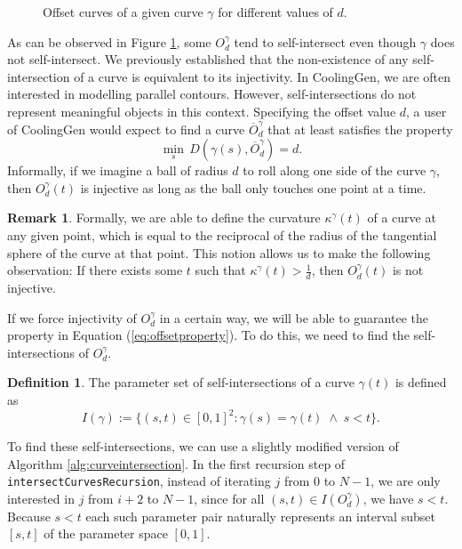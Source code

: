 \documentclass[a4paper, 11pt]{report}
\theoremstyle{definition}
\newtheorem{definition}{Definition}[section]
\newtheorem*{remark}{Remark}
\begin{document}
	\begin{figure}[H]
		\centering
		
		\caption{Offset curves of a given curve $\gamma$ for different values of $d$.}
		\label{fig:offsetcurveexample}
	\end{figure}

	As can be observed in Figure \ref{fig:offsetcurveexample}, some $O^\gamma_d$ tend to self-intersect even though $\gamma$ does not self-intersect. We previously established that the non-existence of any self-intersection of a curve is equivalent to its injectivity. In CoolingGen, we are often interested in modelling parallel contours. However, self-intersections do not represent meaningful objects in this context. Specifying the offset value $d$, a user of CoolingGen would expect to find a curve $\overline{O}^\gamma_d$ that at least satisfies the property
	\begin{equation}\label{eq:offsetproperty}
		\min_s \, D(\gamma(s), \overline{O}^\gamma_d) = d.
	\end{equation}
	Informally, if we imagine a ball of radius $d$ to roll along one side of the curve $\gamma$, then $O^\gamma_d(t)$ is injective as long as the ball only touches one point at a time.
	\begin{remark}
		Formally, we are able to define the curvature $\kappa^\gamma(t)$ of a curve at any given point, which is equal to the reciprocal of the radius of the tangential sphere of the curve at that point. This notion allows us to make the following observation: If there exists some $t$ such that $\kappa^\gamma(t) > \frac{1}{d}$, then $O^\gamma_d(t)$ is not injective.
	\end{remark}

	If we force injectivity of $O^\gamma_d$ in a certain way, we will be able to guarantee the property in Equation (\ref{eq:offsetproperty}). To do this, we need to find the self-intersections of $O^\gamma_d$.

	\begin{definition}
		The parameter set of self-intersections of a curve $\gamma(t)$ is defined as
			$$ I(\gamma) := \{(s,t) \in [0,1]^2 : \gamma(s) = \gamma(t) \;\wedge\; s < t \}. $$
	\end{definition}

	To find these self-intersections, we can use a slightly modified version of Algorithm \ref{alg:curveintersection}. In the first recursion step of \texttt{intersectCurvesRecursion}, instead of iterating $j$ from $0$ to $N-1$, we are only interested in $j$ from $i+2$ to $N-1$, since for all $(s,t) \in I(O^\gamma_d)$, we have $s < t$. Because $s < t$ each such parameter pair naturally represents an interval subset $[s, t]$ of the parameter space $[0, 1]$.
\end{document}
